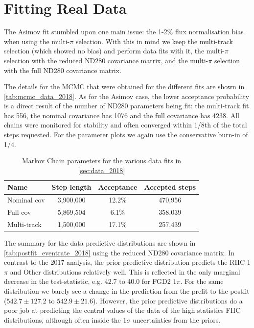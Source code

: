 \section{Fitting Real Data}
\label{sec:data_2018}
The Asimov fit stumbled upon one main issue: the 1-2\% flux normalisation bias when using the multi-$\pi$ selection. With this in mind we keep the multi-track selection (which showed no bias) and perform data fits with it, the multi-$\pi$ selection with the reduced ND280 covariance matrix, and the multi-$\pi$ selection with the full ND280 covariance matrix.

The details for the MCMC that were obtained for the different fits are shown in \autoref{tab:mcmc_data_2018}. As for the Asimov case, the lower acceptance probability is a direct result of the number of ND280 parameters being fit: the multi-track fit has 556, the nominal covariance has 1076 and the full covariance has 4238. All chains were monitored for stability and often converged within 1/8th of the total steps requested. For the parameter plots we again use the conservative burn-in of 1/4.
\begin{table}[h]
	\begin{tabular}{l | c c c}
		\hline
		\hline
		Name		&	Step length & Acceptance & Accepted steps \\
		\hline
		Nominal cov	& 	3,900,000	& 12.2\%	 & 470,956 \\
		Full cov	& 	5,869,504	& 6.1\%		 & 358,039 \\
		Multi-track & 	1,500,000	& 17.1\%	 & 257,439 \\
		\hline
		\hline
	\end{tabular}
	\caption{Markov Chain parameters for the various data fits in \autoref{sec:data_2018}}
	\label{tab:mcmc_data_2018}
\end{table}

The summary for the data predictive distributions are shown in \autoref{tab:postfit_eventrate_2018} using the reduced ND280 covariance matrix. In contrast to the 2017 analysis, the prior predictive distribution predicts the RHC 1$\pi$ and Other distributions relatively well. This is reflected in the only marginal decrease in the test-statistic, e.g. 42.7 to 40.0 for FGD2 \numubar $1\pi$. For the same distribution we barely see a change in the prediction from the prefit to the postfit ($542.7\pm127.2$ to $542.9\pm21.6$). However, the prior predictive distributions do a poor job at predicting the central values of the data of the high statistics FHC distributions, although often inside the 1$\sigma$ uncertainties from the priors.

